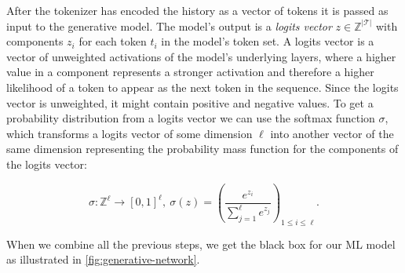 After the tokenizer has encoded the history as a vector of tokens it is passed as input to the generative model.
The model's output is a \emph{logits vector} $z \in \mathbb{Z}^{|\mathcal{T}|}$ with components $z_i$ for each token $t_i$ in the model's token set.
A logits vector is a vector of unweighted activations of the model's underlying layers, where a higher value in a component represents a stronger activation and therefore a higher likelihood of a token to appear as the next token in the sequence.
Since the logits vector is unweighted, it might contain positive and negative values.
To get a probability distribution from a logits vector we can use the softmax function $\sigma$, which transforms a logits vector of some dimension $\ell$ into another vector of the same dimension representing the probability mass function for the components of the logits vector:

$$\sigma \colon \mathbb{Z}^{\ell} \rightarrow [0,1]^{\ell},~ \sigma(z) = \left(\frac{e^{z_i}}{\sum_{j=1}^{\ell} e^{z_j}}\right)_{1 \leq i \leq \ell}.$$

When we combine all the previous steps, we get the black box for our ML model as illustrated in \autoref{fig:generative-network}.

